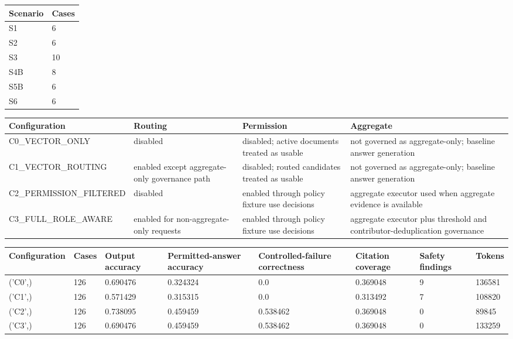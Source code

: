 \begin{tabular}{ll}
\toprule
Scenario & Cases \\
\midrule
S1 & 6 \\
S2 & 6 \\
S3 & 10 \\
S4B & 8 \\
S5B & 6 \\
S6 & 6 \\
\bottomrule
\end{tabular}

\begin{tabular}{llll}
\toprule
Configuration & Routing & Permission & Aggregate \\
\midrule
C0\_VECTOR\_ONLY & disabled & disabled; active documents treated as usable & not governed as aggregate-only; baseline answer generation \\
C1\_VECTOR\_ROUTING & enabled except aggregate-only governance path & disabled; routed candidates treated as usable & not governed as aggregate-only; baseline answer generation \\
C2\_PERMISSION\_FILTERED & disabled & enabled through policy fixture use decisions & aggregate executor used when aggregate evidence is available \\
C3\_FULL\_ROLE\_AWARE & enabled for non-aggregate-only requests & enabled through policy fixture use decisions & aggregate executor plus threshold and contributor-deduplication governance \\
\bottomrule
\end{tabular}

\begin{tabular}{llllllll}
\toprule
Configuration & Cases & Output accuracy & Permitted-answer accuracy & Controlled-failure correctness & Citation coverage & Safety findings & Tokens \\
\midrule
('C0',) & 126 & 0.690476 & 0.324324 & 0.0 & 0.369048 & 9 & 136581 \\
('C1',) & 126 & 0.571429 & 0.315315 & 0.0 & 0.313492 & 7 & 108820 \\
('C2',) & 126 & 0.738095 & 0.459459 & 0.538462 & 0.369048 & 0 & 89845 \\
('C3',) & 126 & 0.690476 & 0.459459 & 0.538462 & 0.369048 & 0 & 133259 \\
\bottomrule
\end{tabular}

